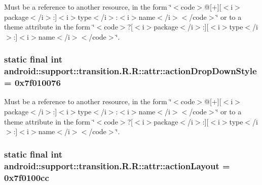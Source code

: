 Must be a reference to another resource, in the form \char`\"{}$<$code$>$@\mbox{[}+\mbox{]}\mbox{[}$<$i$>$package$<$/i$>$:\mbox{]}$<$i$>$type$<$/i$>$:$<$i$>$name$<$/i$>$$<$/code$>$\char`\"{} or to a theme attribute in the form \char`\"{}$<$code$>$?\mbox{[}$<$i$>$package$<$/i$>$:\mbox{]}\mbox{[}$<$i$>$type$<$/i$>$:\mbox{]}$<$i$>$name$<$/i$>$$<$/code$>$\char`\"{}. \hypertarget{classandroid_1_1support_1_1transition_1_1_r_1_1attr_66a6fd3048cac6f5a9185883337006e0}{
\subsubsection[{actionDropDownStyle}]{\setlength{\rightskip}{0pt plus 5cm}static final int android::support::transition.R.R::attr::actionDropDownStyle = 0x7f010076}}
\label{classandroid_1_1support_1_1transition_1_1_r_1_1attr_66a6fd3048cac6f5a9185883337006e0}


Must be a reference to another resource, in the form \char`\"{}$<$code$>$@\mbox{[}+\mbox{]}\mbox{[}$<$i$>$package$<$/i$>$:\mbox{]}$<$i$>$type$<$/i$>$:$<$i$>$name$<$/i$>$$<$/code$>$\char`\"{} or to a theme attribute in the form \char`\"{}$<$code$>$?\mbox{[}$<$i$>$package$<$/i$>$:\mbox{]}\mbox{[}$<$i$>$type$<$/i$>$:\mbox{]}$<$i$>$name$<$/i$>$$<$/code$>$\char`\"{}. \hypertarget{classandroid_1_1support_1_1transition_1_1_r_1_1attr_b66f48be662696ba1b8f3d0a2f9de812}{
\subsubsection[{actionLayout}]{\setlength{\rightskip}{0pt plus 5cm}static final int android::support::transition.R.R::attr::actionLayout = 0x7f0100cc}}
\label{classandroid_1_1support_1_1transition_1_1_r_1_1attr_b66f48be662696ba1b8f3d0a2f9de812}


